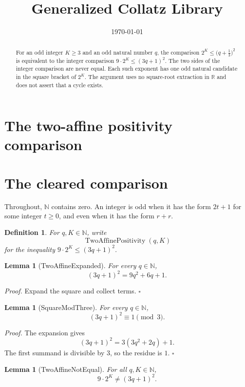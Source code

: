 \documentclass[11pt,letterpaper]{article}
\title{Generalized Collatz Library}
\author{}
\date{\today}
\newcommand{\N}{\mathbb{N}}
\newtheorem{lemma}[theorem]{Lemma}
\newtheorem{definition}[theorem]{Definition}
\newenvironment{proof}{\noindent\textit{Proof.}}{\hfill\(\square\)}
\begin{document}
\maketitle
\section*{The two-affine positivity comparison}

\begin{abstract}
For an odd integer \(K\ge 3\) and an odd natural number \(q\), the comparison
\(2^K\le\bigl(q+\tfrac13\bigr)^2\) is equivalent to the integer comparison
\(9\cdot 2^K\le(3q+1)^2\). The two sides of the integer comparison are never
equal. Each such exponent has one odd natural candidate in the square bracket
of \(2^K\). The argument uses no square-root extraction in \(\mathbb{R}\) and
does not assert that a cycle exists.
\end{abstract}

\section{The cleared comparison}

Throughout, \(\N\) contains zero. An integer is odd when it has the form
\(2t+1\) for some integer \(t\ge 0\), and even when it has the form \(r+r\).

\begin{definition}
For \(q,K\in\N\), write
\[
\operatorname{TwoAffinePositivity}(q,K)
\]
for the inequality \(9\cdot 2^K\le(3q+1)^2\).
\end{definition}

\begin{lemma}[TwoAffineExpanded]
For every \(q\in\N\),
\[
(3q+1)^2=9q^2+6q+1.
\]
\end{lemma}

\begin{proof}
Expand the square and collect terms.
\end{proof}

\begin{lemma}[SquareModThree]
For every \(q\in\N\),
\[
(3q+1)^2\equiv 1\pmod{3}.
\]
\end{lemma}

\begin{proof}
The expansion gives
\[
(3q+1)^2=3(3q^2+2q)+1.
\]
The first summand is divisible by \(3\), so the residue is \(1\).
\end{proof}

\begin{lemma}[TwoAffineNotEqual]
For all \(q,K\in\N\),
\[
9\cdot 2^K\neq(3q+1)^2.
\]
\end{lemma}
\end{document}
